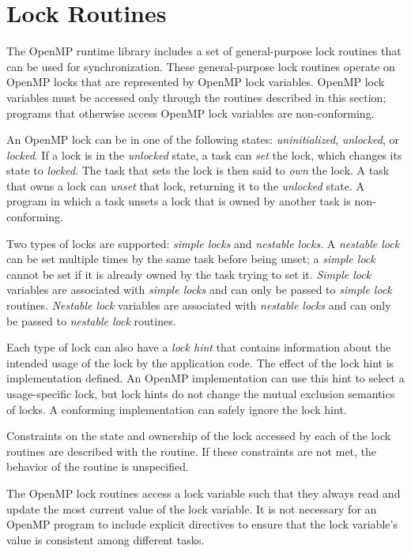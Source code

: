 \section{Lock Routines}
\label{sec:Lock Routines}

\vspace{-8pt}

The OpenMP runtime library includes a set of general-purpose lock routines that can be 
used for synchronization. These general-purpose lock routines operate on OpenMP locks 
that are represented by OpenMP lock variables. OpenMP lock variables must be 
accessed only through the routines described in this section; programs that otherwise 
access OpenMP lock variables are non-conforming.

An OpenMP lock can be in one of the following states: \emph{uninitialized}, \emph{unlocked}, or 
\emph{locked}. If a lock is in the \emph{unlocked} state, a task can \emph{set} the lock, which changes its state 
to \emph{locked}. The task that sets the lock is then said to \emph{own} the lock. A task that owns a 
lock can \emph{unset} that lock, returning it to the \emph{unlocked} state. A program in which a task 
unsets a lock that is owned by another task is non-conforming.

Two types of locks are supported: \emph{simple locks} and \emph{nestable locks}. A \emph{nestable lock} can 
be set multiple times by the same task before being unset; a \emph{simple lock} cannot be set if 
it is already owned by the task trying to set it. \emph{Simple lock} variables are associated with 
\emph{simple locks} and can only be passed to \emph{simple lock} routines. \emph{Nestable lock} variables are 
associated with \emph{nestable locks} and can only be passed to \emph{nestable lock} routines.

Each type of lock can also have a \emph{lock hint} that contains information about the intended usage 
of the lock by the application code.  The effect of the lock hint is
implementation defined.  An OpenMP implementation can use this hint to select a
usage-specific lock, but lock hints do not change the mutual exclusion semantics of locks. 
A conforming implementation can safely ignore the lock hint.

Constraints on the state and ownership of the lock accessed by each of the lock routines 
are described with the routine. If these constraints are not met, the behavior of the 
routine is unspecified. 

The OpenMP lock routines access a lock variable such that they always read 
and update the most current value of the lock variable. It is not necessary for an 
OpenMP program to include explicit  directives to ensure that the lock variable's 
value is consistent among different tasks. 


